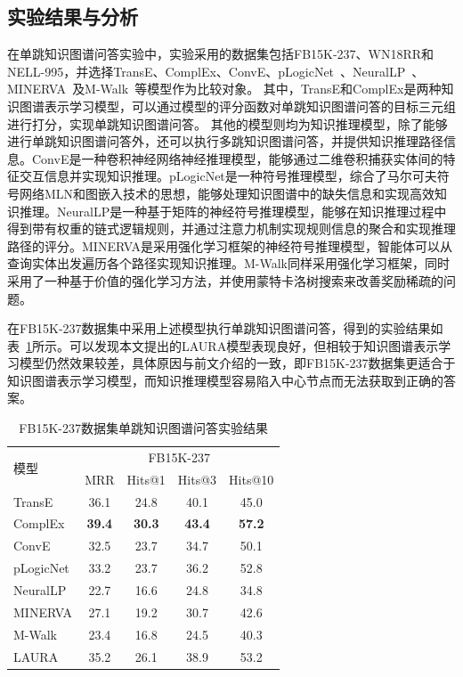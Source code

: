 \documentclass[algorithmlist, AutoFakeBold, AutoFakeSlant, figurelist, tablelist, nomlist, masters]{seuthesix}
\begin{document}
\subsection{实验结果与分析}
在单跳知识图谱问答实验中，实验采用的数据集包括FB15K-237、WN18RR和NELL-995，并选择TransE、ComplEx、ConvE、pLogicNet~\cite{qu2019probabilistic}、NeuralLP~\cite{yang2017differentiable}、MINERVA~\cite{das2018go}及M-Walk~\cite{shen2018m}等模型作为比较对象。
其中，TransE和ComplEx是两种知识图谱表示学习模型，可以通过模型的评分函数对单跳知识图谱问答的目标三元组进行打分，实现单跳知识图谱问答。
其他的模型则均为知识推理模型，除了能够进行单跳知识图谱问答外，还可以执行多跳知识图谱问答，并提供知识推理路径信息。ConvE是一种卷积神经网络神经推理模型，能够通过二维卷积捕获实体间的特征交互信息并实现知识推理。pLogicNet是一种符号推理模型，综合了马尔可夫符号网络MLN和图嵌入技术的思想，能够处理知识图谱中的缺失信息和实现高效知识推理。NeuralLP是一种基于矩阵的神经符号推理模型，能够在知识推理过程中得到带有权重的链式逻辑规则，并通过注意力机制实现规则信息的聚合和实现推理路径的评分。MINERVA是采用强化学习框架的神经符号推理模型，智能体可以从查询实体出发遍历各个路径实现知识推理。M-Walk同样采用强化学习框架，同时采用了一种基于价值的强化学习方法，并使用蒙特卡洛树搜索来改善奖励稀疏的问题。

在FB15K-237数据集中采用上述模型执行单跳知识图谱问答，得到的实验结果如表~\ref{Experiment2_FB15K-237}所示。可以发现本文提出的LAURA模型表现良好，但相较于知识图谱表示学习模型仍然效果较差，具体原因与前文介绍的一致，即FB15K-237数据集更适合于知识图谱表示学习模型，而知识推理模型容易陷入中心节点而无法获取到正确的答案。
\begin{table}[]
  \centering
  \begin{tabular*}{0.95\textwidth}{@{\extracolsep{\fill}}lcccc}
  \toprule[1pt]
  \multirow{2}{*}{模型} & \multicolumn{4}{c}{FB15K-237}   \\
    & MRR & Hits@1 & Hits@3 & Hits@10 \\ \hline
  TransE & 36.1 & 24.8 & 40.1 & 45.0 \\
  ComplEx & \textbf{39.4} & \textbf{30.3} & \textbf{43.4} & \textbf{57.2} \\
  ConvE & 32.5 & 23.7 & 34.7 & 50.1 \\
  pLogicNet & 33.2 & 23.7 & 36.2 & 52.8 \\
  NeuralLP & 22.7 & 16.6 & 24.8 & 34.8 \\
  MINERVA & 27.1 & 19.2 & 30.7 & 42.6 \\
  M-Walk & 23.4 & 16.8 & 24.5 & 40.3 \\
  LAURA & 35.2 & 26.1 & 38.9 & 53.2 \\
  \bottomrule[1pt]
  \end{tabular*}
  \caption{FB15K-237数据集单跳知识图谱问答实验结果}
  \label{Experiment2_FB15K-237}
\end{table}
\end{document}
